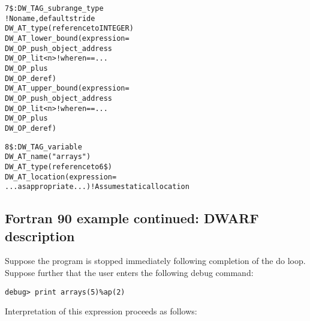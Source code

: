 \begin{alltt}
7\$: DW\_TAG\_subrange\_type
        ! No name, default stride
        DW\_AT\_type(reference to INTEGER)
        DW\_AT\_lower\_bound(expression=
            DW\_OP\_push\_object\_address
            DW\_OP\_lit<n> ! where n == ...
            DW\_OP\_plus
            DW\_OP\_deref)
        DW\_AT\_upper\_bound(expression=
            DW\_OP\_push\_object\_address
            DW\_OP\_lit<n> ! where n == ...
            DW\_OP\_plus
            DW\_OP\_deref)

8\$: DW\_TAG\_variable
        DW\_AT\_name("arrays")
        DW\_AT\_type(reference to 6\$)
        DW\_AT\_location(expression=
            ...as appropriate...) ! Assume static allocation
\end{alltt}

\subsection{Fortran 90 example continued: DWARF description}
\label{app:fortran90examplecontinueddwarfdescription}

Suppose the program is stopped immediately following completion
of the do loop. Suppose further that the user enters the
following debug command:

\begin{lstlisting}
debug> print arrays(5)%ap(2)
\end{lstlisting}

Interpretation of this expression proceeds as follows:

